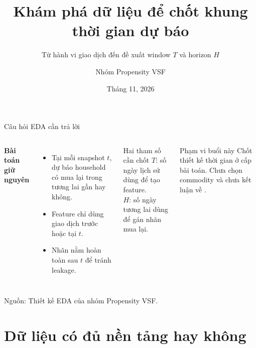 \documentclass[aspectratio=169,11pt]{beamer}
\date{Tháng 11, 2026}
\author{Nhóm Propensity VSF}
\institute{EDA dữ liệu Dunnhumby}
\title{Khám phá dữ liệu để chốt khung thời gian dự báo}
\subtitle{Từ hành vi giao dịch đến đề xuất window $T$ và horizon $H$}
\newcommand{\src}[1]{\par\vfill{\tiny\color{gray}Nguồn: #1}}
\newcommand{\code}[1]{\texttt{\detokenize{#1}}}
\begin{document}
\begin{frame}[plain]\titlepage\end{frame}

\begin{frame}{Câu hỏi EDA cần trả lời}
\begin{columns}[T]
\textbf{Bài toán giữ nguyên}
\begin{itemize}
\item Tại mỗi snapshot $t$, dự báo household có mua lại trong tương lai gần hay không.
\item Feature chỉ dùng giao dịch trước hoặc tại $t$.
\item Nhãn nằm hoàn toàn sau $t$ để tránh leakage.
\end{itemize}
\medskip
\begin{block}{Hai tham số cần chốt}
$T$: số ngày lịch sử dùng để tạo feature.\\
$H$: số ngày tương lai dùng để gán nhãn mua lại.
\end{block}
\centering
{}
\vspace{.55cm}
\begin{alertblock}{Phạm vi buổi này}
Chốt thiết kế thời gian ở cấp bài toán. Chưa chọn commodity và chưa kết luận về \code{CHEESE}.
\end{alertblock}
\end{columns}
\src{Thiết kế EDA của nhóm Propensity VSF.}
\end{frame}

\section{Dữ liệu có đủ nền tảng hay không}
\end{document}
